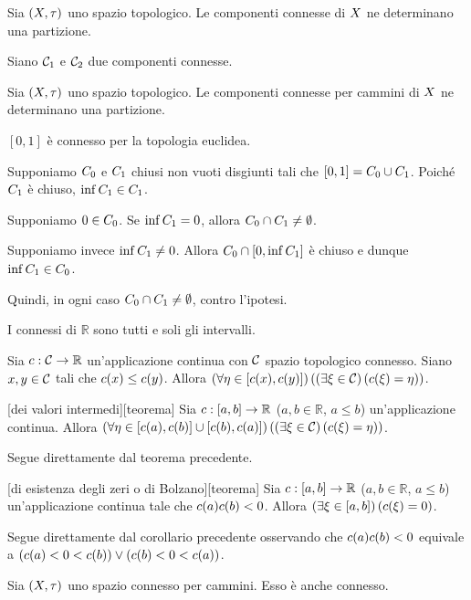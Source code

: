 \begin{Theorem}
	Sia $(X,\tau)$ uno spazio topologico.
	Le componenti connesse di $X$ ne determinano una
	partizione.
\end{Theorem}
\Proof Siano $\mathcal{C}_1$ e $\mathcal{C}_2$ due
componenti connesse. 
\begin{Theorem}
	Sia $(X,\tau)$ uno spazio topologico.
	Le componenti connesse per cammini di $X$ ne
	determinano una partizione.
\end{Theorem}
\begin{Theorem}
	$[0,1]$ \`e connesso per la topologia euclidea.
\end{Theorem}
\Proof Supponiamo $C_0$ e $C_1$ chiusi non vuoti disgiunti tali che $[0,1] = C_0 \cup C_1$. Poich\'e $C_1$ \`e chiuso, $\inf C_1 \in C_1$.
\par Supponiamo $0 \in C_0$. Se $\inf C_1 = 0$, allora $C_0 \cap C_1 \neq \emptyset$.
\par Supponiamo invece $\inf C_1 \neq 0$. Allora $C_0 \cap [0,\inf{C_1}]$ \`e chiuso e dunque $\inf{C_1} \in C_0$.
\par Quindi, in ogni caso $C_0 \cap C_1 \neq \emptyset$, contro l'ipotesi. \EndProof
\begin{Theorem}
	I connessi di $\mathbb{R}$ sono tutti e soli gli intervalli.
\end{Theorem}
\Proof
\begin{Theorem}
	Sia $c: \mathcal{C} \rightarrow \mathbb{R}$ un'applicazione continua con $\mathcal{C}$ spazio topologico connesso. Siano $x, y \in \mathcal{C}$ tali che $c(x) \leq c(y)$. Allora $\left ( \forall \eta \in [c(x),c(y)] \right ) \left ( \left ( \exists \xi \in \mathcal{C} \right ) \left ( c(\xi) = \eta \right ) \right )$.
\end{Theorem}
\begin{Corollary}
	[dei valori intermedi][teorema] Sia $c: [a,b] \rightarrow \mathbb{R}$ ($a,b \in \mathbb{R}$, $a \leq b$) un'applicazione continua. Allora $\left ( \forall \eta \in [c(a),c(b)] \cup [c(b),c(a)] \right ) \left ( \left ( \exists \xi \in \mathcal{C} \right ) \left ( c(\xi) = \eta \right ) \right )$.
\end{Corollary}
\Proof Segue direttamente dal teorema precedente. \EndProof
\begin{Corollary}
	[di esistenza degli zeri o di Bolzano][teorema] Sia $c: [a,b] \rightarrow \mathbb{R}$ ($a,b \in \mathbb{R}$, $a \leq b$) un'applicazione continua tale che $c(a) c(b) < 0$. Allora $\left ( \exists \xi \in [a,b] \right ) \left ( c(\xi) = 0 \right )$.
\end{Corollary}
\Proof Segue direttamente dal corollario precedente osservando che $c(a) c(b) < 0$ equivale a $\left ( c(a) < 0 < c(b) \right ) \vee \left ( c(b) < 0 < c(a) \right )$. \EndProof
\begin{Theorem}
	Sia $(X,\tau)$ uno spazio connesso per cammini.
	Esso \`e anche connesso.
\end{Theorem}
\Proof 
